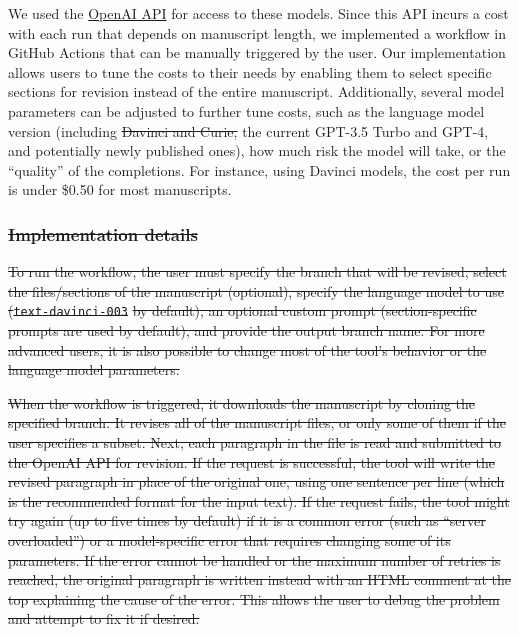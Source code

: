 \documentclass[
]{article}
\providecommand{\DIFaddtex}[1]{{\protect\color{blue}\uwave{#1}}} %
\providecommand{\DIFdeltex}[1]{{\protect\color{red}\sout{#1}}}                      %
\providecommand{\DIFaddbegin}{} %
\providecommand{\DIFaddend}{} %
\providecommand{\DIFdelbegin}{} %
\providecommand{\DIFdelend}{} %
\providecommand{\DIFadd}[1]{\texorpdfstring{\DIFaddtex{#1}}{#1}} %
\providecommand{\DIFdel}[1]{\texorpdfstring{\DIFdeltex{#1}}{}} %
\newcommand{\DIFscaledelfig}{0.5}
\newlength{\DIFdelgraphicswidth} %
\newlength{\DIFdelgraphicsheight} %
\newcommand{\DIFaddincludegraphics}[2][]{{\color{blue}\fbox{\DIFOincludegraphics[#1]{#2}}}} %
\newcommand{\DIFdelincludegraphics}[2][]{%
\sbox{\DIFdelgraphicsbox}{\DIFOincludegraphics[#1]{#2}}%
\settoboxwidth{\DIFdelgraphicswidth}{\DIFdelgraphicsbox} %
\settoboxtotalheight{\DIFdelgraphicsheight}{\DIFdelgraphicsbox} %
\scalebox{\DIFscaledelfig}{%
\parbox[b]{\DIFdelgraphicswidth}{\usebox{\DIFdelgraphicsbox}\\[-\baselineskip] \rule{\DIFdelgraphicswidth}{0em}}\llap{\resizebox{\DIFdelgraphicswidth}{\DIFdelgraphicsheight}{%
\setlength{\unitlength}{\DIFdelgraphicswidth}%
\begin{picture}(1,1)%
\thicklines\linethickness{2pt} %
{\color[rgb]{1,0,0}\put(0,0){\framebox(1,1){}}}%
{\color[rgb]{1,0,0}\put(0,0){\line( 1,1){1}}}%
{\color[rgb]{1,0,0}\put(0,1){\line(1,-1){1}}}%
\end{picture}%
}\hspace*{3pt}}} %
} %
\DeclareRobustCommand{\DIFaddbegin}{\DIFOaddbegin \let\includegraphics\DIFaddincludegraphics} %
\DeclareRobustCommand{\DIFaddend}{\DIFOaddend \let\includegraphics\DIFOincludegraphics} %
\DeclareRobustCommand{\DIFdelbegin}{\DIFOdelbegin \let\includegraphics\DIFdelincludegraphics} %
\DeclareRobustCommand{\DIFdelend}{\DIFOaddend \let\includegraphics\DIFOincludegraphics} %
\begin{document}
We used the \href{https://openai.com/api/}{OpenAI API} for access to these models.
Since this API incurs a cost with each run that depends on \DIFaddbegin \DIFadd{the }\DIFaddend manuscript length, we implemented a workflow in GitHub Actions that can be manually triggered by the user.
Our implementation allows users to tune the costs to their needs by enabling them to select specific sections for revision instead of the entire manuscript.
Additionally, several model parameters can be adjusted to further tune costs, such as the language model version (including \DIFdelbegin \DIFdel{Davinci and Curie, }\DIFdelend the current GPT-3.5 Turbo and GPT-4, and potentially newly published ones), how much risk the model will take, or the ``quality'' of the completions.
For instance, using Davinci models, the cost per run is under \$0.50 for most manuscripts.
\DIFdelbegin %

\subsubsection{\DIFdel{Implementation details}}
\addtocounter{subsubsection}{-1}%

\DIFdel{To run the workflow, the user must specify the branch that will be revised, select the files/sections of the manuscript (optional), specify the language model to use (}\texttt{\DIFdel{text-davinci-003}} %
\DIFdel{by default), an optional custom prompt (section-specific prompts are used by default), and provide the output branch name.
For more advanced users, it is also possible to change most of the tool's behavior or the language model parameters.
}%

\DIFdel{When the workflow is triggered, it downloads the manuscript by cloning the specified branch.
It revises all of the manuscript files, or only some of them if the user specifies a subset.
Next, each paragraph in the file is read and submitted to the OpenAI API for revision.
If the request is successful, the tool will write the revised paragraph in place of the original one, using one sentence per line (which is the recommended format for the input text).
If the request fails, the tool might try again (up to five times by default) if it is a common error (such as ``server overloaded'') or a model-specific error that requires changing some of its parameters.
If the error cannot be handled or the maximum number of retries is reached, the original paragraph is written instead with an HTML comment at the top explaining the cause of the error.
This allows the user to debug the problem and attempt to fix it if desired.
}%
\end{document}
